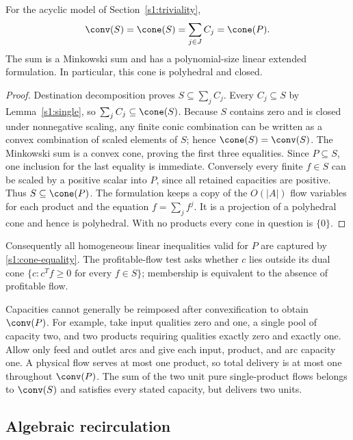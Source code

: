 \begin{theorem}\label{s1:cone-theorem}
For the acyclic model of Section~\ref{s1:triviality},
\begin{equation}
 \conv(S)=\cone(S)=\sum_{j\in J}C_j=\cone(P).\label{s1:cone-equality}
\end{equation}
The sum is a Minkowski sum and has a polynomial-size linear extended
formulation. In particular, this cone is polyhedral and closed.
\end{theorem}
\begin{proof}
Destination decomposition proves $S\subseteq\sum_jC_j$.
Every $C_j\subseteq S$ by Lemma~\ref{s1:single}, so
$\sum_jC_j\subseteq\cone(S)$. Because $S$ contains zero and is closed
under nonnegative scaling, any finite conic combination can be written
as a convex combination of scaled elements of $S$; hence
$\cone(S)=\conv(S)$. The Minkowski sum is a convex cone, proving the
first three equalities. Since $P\subseteq S$, one inclusion for the
last equality is immediate. Conversely every finite $f\in S$ can be
scaled by a positive scalar into $P$, since all retained capacities
are positive. Thus $S\subseteq\cone(P)$. The formulation keeps a copy
of the $O(|A|)$ flow variables for each product and the equation
$f=\sum_jf^j$. It is a projection of a polyhedral cone and hence is
polyhedral. With no products every cone in question is $\{0\}$.
\end{proof}

Consequently all homogeneous linear inequalities valid for $P$ are
captured by \eqref{s1:cone-equality}. The profitable-flow test asks whether
$c$ lies outside its dual cone
$\{c:c^Tf\ge0\text{ for every }f\in S\}$; membership is equivalent
to the absence of profitable flow.

Capacities cannot generally be reimposed after convexification to obtain
$\conv(P)$. For example, take input qualities zero and one, a single
pool of capacity two, and two products requiring qualities exactly zero
and exactly one. Allow only feed and outlet arcs and give each input,
product, and arc capacity one. A physical flow serves at most one
product, so total delivery is at most one throughout $\conv(P)$.
The sum of the two unit pure single-product flows belongs to
$\conv(S)$ and satisfies every stated capacity, but delivers two units.

\subsection{Algebraic recirculation}\label{s1:cycles}

